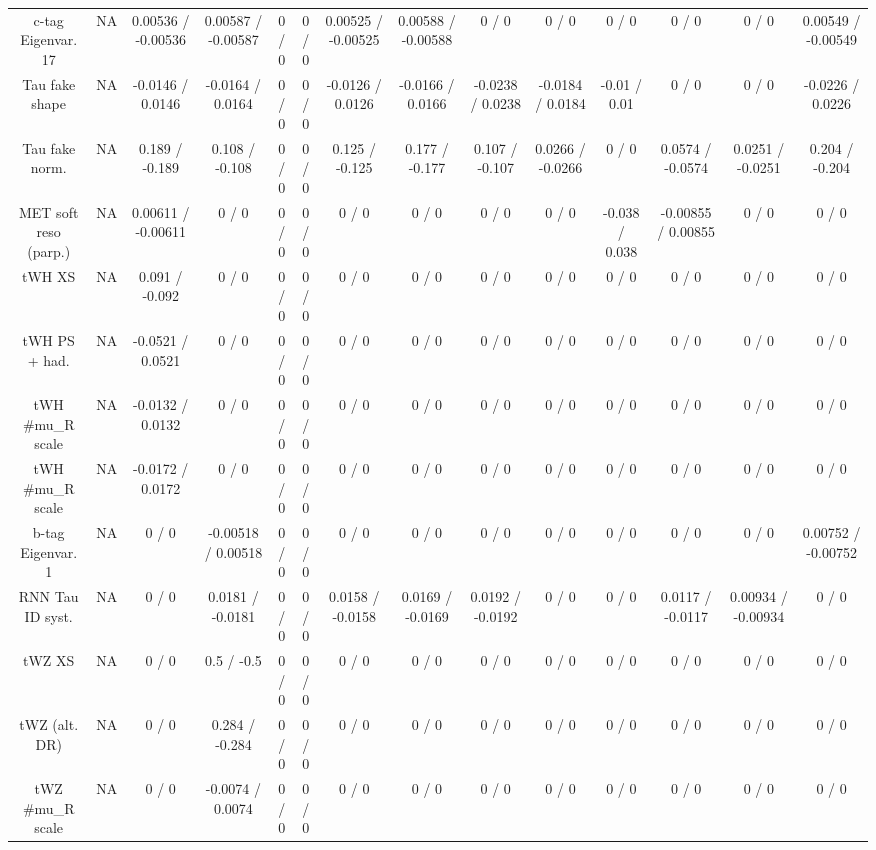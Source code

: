 \documentclass[10pt]{article}
\begin{document}
\begin{table}[htbp]
\begin{center}
\begin{tabular}{|c|c|c|c|c|c|c|c|c|c|c|c|c|c|}
  c-tag Eigenvar. 17 &    NA    & 0.00536 / -0.00536 & 0.00587 / -0.00587 & 0 / 0 & 0 / 0 & 0.00525 / -0.00525 & 0.00588 / -0.00588 & 0 / 0 & 0 / 0 & 0 / 0 & 0 / 0 & 0 / 0 & 0.00549 / -0.00549 \\ 
  Tau fake shape &    NA    & -0.0146 / 0.0146 & -0.0164 / 0.0164 & 0 / 0 & 0 / 0 & -0.0126 / 0.0126 & -0.0166 / 0.0166 & -0.0238 / 0.0238 & -0.0184 / 0.0184 & -0.01 / 0.01 & 0 / 0 & 0 / 0 & -0.0226 / 0.0226 \\ 
  Tau fake norm. &    NA    & 0.189 / -0.189 & 0.108 / -0.108 & 0 / 0 & 0 / 0 & 0.125 / -0.125 & 0.177 / -0.177 & 0.107 / -0.107 & 0.0266 / -0.0266 & 0 / 0 & 0.0574 / -0.0574 & 0.0251 / -0.0251 & 0.204 / -0.204 \\ 
  MET soft reso (parp.) &    NA    & 0.00611 / -0.00611 & 0 / 0 & 0 / 0 & 0 / 0 & 0 / 0 & 0 / 0 & 0 / 0 & 0 / 0 & -0.038 / 0.038 & -0.00855 / 0.00855 & 0 / 0 & 0 / 0 \\ 
  tWH XS &    NA    & 0.091 / -0.092 & 0 / 0 & 0 / 0 & 0 / 0 & 0 / 0 & 0 / 0 & 0 / 0 & 0 / 0 & 0 / 0 & 0 / 0 & 0 / 0 & 0 / 0 \\ 
  tWH PS + had. &    NA    & -0.0521 / 0.0521 & 0 / 0 & 0 / 0 & 0 / 0 & 0 / 0 & 0 / 0 & 0 / 0 & 0 / 0 & 0 / 0 & 0 / 0 & 0 / 0 & 0 / 0 \\ 
  tWH #mu_{R} scale &    NA    & -0.0132 / 0.0132 & 0 / 0 & 0 / 0 & 0 / 0 & 0 / 0 & 0 / 0 & 0 / 0 & 0 / 0 & 0 / 0 & 0 / 0 & 0 / 0 & 0 / 0 \\ 
  tWH #mu_{R} scale &    NA    & -0.0172 / 0.0172 & 0 / 0 & 0 / 0 & 0 / 0 & 0 / 0 & 0 / 0 & 0 / 0 & 0 / 0 & 0 / 0 & 0 / 0 & 0 / 0 & 0 / 0 \\ 
  b-tag Eigenvar. 1 &    NA    & 0 / 0 & -0.00518 / 0.00518 & 0 / 0 & 0 / 0 & 0 / 0 & 0 / 0 & 0 / 0 & 0 / 0 & 0 / 0 & 0 / 0 & 0 / 0 & 0.00752 / -0.00752 \\ 
  RNN Tau ID syst. &    NA    & 0 / 0 & 0.0181 / -0.0181 & 0 / 0 & 0 / 0 & 0.0158 / -0.0158 & 0.0169 / -0.0169 & 0.0192 / -0.0192 & 0 / 0 & 0 / 0 & 0.0117 / -0.0117 & 0.00934 / -0.00934 & 0 / 0 \\ 
  tWZ XS &    NA    & 0 / 0 & 0.5 / -0.5 & 0 / 0 & 0 / 0 & 0 / 0 & 0 / 0 & 0 / 0 & 0 / 0 & 0 / 0 & 0 / 0 & 0 / 0 & 0 / 0 \\ 
  tWZ (alt. DR) &    NA    & 0 / 0 & 0.284 / -0.284 & 0 / 0 & 0 / 0 & 0 / 0 & 0 / 0 & 0 / 0 & 0 / 0 & 0 / 0 & 0 / 0 & 0 / 0 & 0 / 0 \\ 
  tWZ #mu_{R} scale &    NA    & 0 / 0 & -0.0074 / 0.0074 & 0 / 0 & 0 / 0 & 0 / 0 & 0 / 0 & 0 / 0 & 0 / 0 & 0 / 0 & 0 / 0 & 0 / 0 & 0 / 0 \\ 

\end{tabular}
\end{center}
\end{table}
\end{document}

